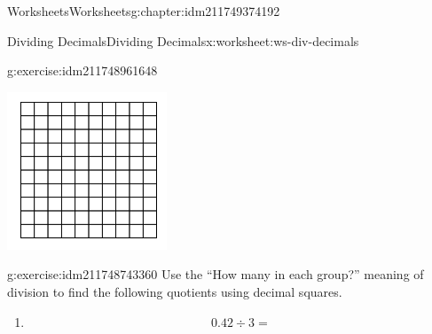 \documentclass[twoside,11pt,]{book}
\begin{document}
\begin{chapterptx}{Worksheets}{}{Worksheets}{}{}{g:chapter:idm211749374192}
\begin{worksheet-section-numberless}{Dividing Decimals}{}{Dividing Decimals}{}{}{x:worksheet:ws-div-decimals}
\begin{divisionexercise}{1}{}{}{g:exercise:idm211748961648}
\begin{enumerate}[label=(\alph*)]
\begin{sidebyside}{1}{0.3}{0.3}{0}
\begin{sbspanel}{0.4}
\includegraphics[width=1\linewidth]{images/decimal-square.png}
\end{sbspanel}%
\end{sidebyside}%
%
\end{enumerate}
\end{divisionexercise}%
\clearpage
\begin{divisionexercise}{2}{}{}{g:exercise:idm211748743360}%
Use the ``How many in each group?''  meaning of division to find the following quotients using decimal squares.%
%
\begin{enumerate}[label=(\alph*)]
\item{}%
\begin{equation*}
0.42 \div 3 = 
\end{equation*}
\begin{sidebyside}{1}{0.3}{0.3}{0}%
\begin{sbspanel}{0.4}%

\end{sbspanel}
\end{sidebyside}
\end{enumerate}
\end{divisionexercise}
\end{worksheet-section-numberless}
\end{chapterptx}
\end{document}

